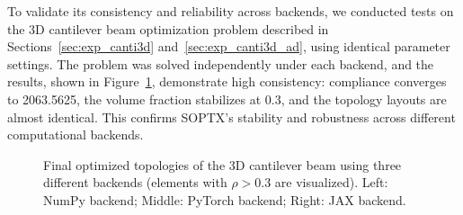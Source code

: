 \documentclass[mathpazo]{cicp}
\begin{document}
To validate its consistency and reliability across backends, we conducted tests on the 3D cantilever beam optimization problem described in Sections~\ref{sec:exp_canti3d} and~\ref{sec:exp_canti3d_ad}, using identical parameter settings. The problem was solved independently under each backend, and the results, shown in Figure~\ref{fig:canti3d_backend_compare}, demonstrate high consistency: compliance converges to 2063.5625, the volume fraction stabilizes at 0.3, and the topology layouts are almost identical. This confirms SOPTX's stability and robustness across different computational backends.
\vspace{-2ex} %
\begin{figure}[htp]
	\centering
	\caption{Final optimized topologies of the 3D cantilever beam using three different backends (elements with $\rho>0.3$ are visualized). Left: NumPy backend; Middle: PyTorch backend; Right: JAX backend.}
	\label{fig:canti3d_backend_compare}
\end{figure}
\vspace{-2ex} %
\end{document}
